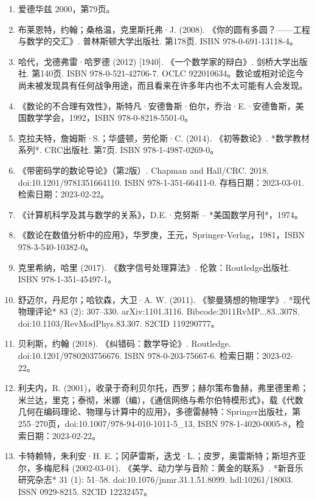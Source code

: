 \begin{enumerate}
\item 爱德华兹 2000，第79页。
\item 布莱恩特，约翰；桑格温，克里斯托弗·J. (2008). 《你的圆有多圆？——工程与数学的交汇》. 普林斯顿大学出版社. 第178页. ISBN 978-0-691-13118-4。
\item 哈代，戈德弗雷·哈罗德 (2012) [1940]. 《一个数学家的辩白》. 剑桥大学出版社. 第140页. ISBN 978-0-521-42706-7. OCLC 922010634。数论或相对论迄今尚未被发现具有任何战争用途，而且看来在许多年内也不太可能有人会发现。
\item 《数论的不合理有效性》，斯特凡·安德鲁斯·伯尔，乔治·E.·安德鲁斯，美国数学学会，1992，ISBN 978-0-8218-5501-0。
\item 克拉夫特，詹姆斯·S.；华盛顿，劳伦斯·C. (2014). 《初等数论》. *数学教材系列*. CRC出版社. 第7页. ISBN 978-1-4987-0269-0。
\item 《带密码学的数论导论》（第2版）. Chapman and Hall/CRC. 2018. doi:10.1201/9781351664110. ISBN 978-1-351-66411-0. 存档日期：2023-03-01. 检索日期：2023-02-22。
\item 《计算机科学及其与数学的关系》，D.E.·克努斯 – *美国数学月刊*，1974。
\item 《数论在数值分析中的应用》，华罗庚，王元，Springer-Verlag，1981，ISBN 978-3-540-10382-0。
\item 克里希纳，哈里 (2017). 《数字信号处理算法》. 伦敦：Routledge出版社. ISBN 978-1-351-45497-1。
\item 舒迈尔，丹尼尔；哈钦森，大卫·A. W. (2011). 《黎曼猜想的物理学》. *现代物理评论* 83 (2): 307–330. arXiv:1101.3116. Bibcode:2011RvMP...83..307S. doi:10.1103/RevModPhys.83.307. S2CID 119290777。
\item 贝利斯，约翰 (2018). 《纠错码：数学导论》. Routledge. doi:10.1201/9780203756676. ISBN 978-0-203-75667-6. 检索日期：2023-02-22。
\item 利夫内，R. (2001)，收录于奇利贝尔托，西罗；赫尔策布鲁赫，弗里德里希；米兰达，里克；泰彻，米娜（编），《通信网络与希尔伯特模形式》，载《代数几何在编码理论、物理与计算中的应用》，多德雷赫特：Springer出版社，第255–270页，doi:10.1007/978-94-010-1011-5_13, ISBN 978-1-4020-0005-8，检索日期：2023-02-22。
\item 卡特赖特，朱利安·H. E.；冈萨雷斯，迭戈·L.；皮罗，奥雷斯特；斯坦齐亚尔，多梅尼科 (2002-03-01). 《美学、动力学与音阶：黄金的联系》. *新音乐研究杂志* 31 (1): 51–58. doi:10.1076/jnmr.31.1.51.8099. hdl:10261/18003. ISSN 0929-8215. S2CID 12232457。
\end{enumerate}